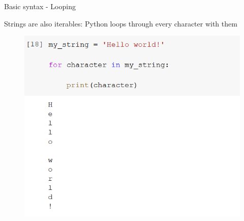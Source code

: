 \documentclass[aspectratio=169]{beamer}
\begin{document}
\begin{frame}{Basic syntax - Looping}

	Strings are also iterables: Python loops through every character with them

	\begin{figure}
		\centering
		\includegraphics[width=0.55\linewidth]{img/string_loop.png}
	\end{figure}

\end{frame}
\end{document}
